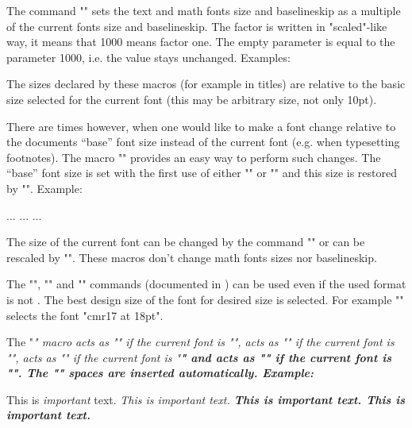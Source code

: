 \begtt
\typosize[10/12]   %
\typosize[11/12.5] %
\typosize[8/]      %
\endtt

The command
""
sets the text and math fonts
size and baselineskip as a multiple of the current fonts size and
baselineskip. The factor is written in "scaled"-like way, it means that 1000
means factor one. The empty parameter is equal to the parameter 1000,
i.e. the value stays unchanged. Examples:

\begtt
\typoscale[800/800]    %
\typoscale[\magstep2/] %
\endtt

The sizes declared by these macros (for example in titles) are relative to the
basic size selected for the current font (this may be arbitrary size, not only
10pt).

There are times however, when one would like to make a font change relative to
the documents ``base'' font size instead of the current font (e.g. when
typesetting footnotes). The macro "\typobase" provides an easy way to perform
such changes. The ``base'' font size is set with the first use of either
"\typosize" or "\typoscale" and this size is restored by "\typobase". Example:

\begtt
\typosize[12/14]    %
...
{\typoscale[16/18]  %
 ...
 \typobase\typoscale[750/750] %
 ...           %
}
\endtt

The size of the current font can be changed by the command
"" or can be rescaled by
"\thefontscale[<factor>]". These macros don't change math fonts sizes nor
baselineskip.

The "\resizefont", "\regfont" and "\resizeall" commands (documented in
\csplain) can be used even if
the used format is not \csplain. The best
design size of the font for desired size is selected. 
For example "\typosize[18/]" selects the font "cmr17 at 18pt".

The "\em" macro acts as "\it" if the current font is "\rm", acts as "\rm" if
the current font is "\it", acts as "\bi" if the current font is "\bf" and
acts as "\bf" if the current font is "\bi". The "\/" spaces are inserted
automatically. Example:

\begtt
This is {\em important} text.     %
\it This is {\em important} text. %
\bf This is {\em important} text. %
\bi This is {\em important} text. %
\endtt


